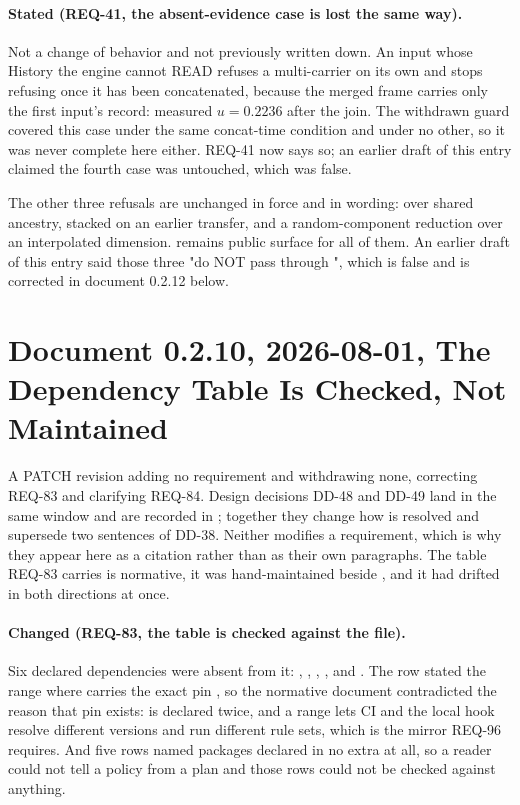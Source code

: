 \paragraph{Stated (REQ-41, the absent-evidence case is lost the same
way).} Not a change of behavior and not previously written down. An input
whose History the engine cannot READ refuses a multi-carrier
 on its own and stops refusing once it has been
concatenated, because the merged frame carries only the first input's
record: measured $u = 0.2236$ after the join. The withdrawn guard covered
this case under the same concat-time condition and under no other, so it
was never complete here either. REQ-41 now says so; an earlier draft of
this entry claimed the fourth case was untouched, which was false.

The other three refusals are unchanged in force and in wording:
 over shared ancestry,  stacked on
an earlier transfer, and a random-component reduction over an
interpolated dimension.  remains public
surface for all of them. An earlier draft of this entry said those three
"do NOT pass through ", which is false and is corrected in
document 0.2.12 below.

\section*{Document 0.2.10, 2026-08-01, The Dependency Table Is Checked, Not Maintained}

A PATCH revision adding no requirement and withdrawing none, correcting
REQ-83 and clarifying REQ-84. Design decisions DD-48 and DD-49 land in
the same window and are recorded in ; together
they change how  is resolved and supersede
two sentences of DD-38. Neither modifies a requirement, which is why
they appear here as a citation rather than as their own paragraphs. The
table REQ-83 carries is normative, it was hand-maintained beside
, and it had drifted in both directions at once.

\paragraph{Changed (REQ-83, the table is checked against the file).}
Six declared dependencies were absent from it: ,
, , , 
and . The  row stated the range
 where  carries the exact pin
, so the normative document contradicted the reason
that pin exists:  is declared twice, and a range lets CI and
the local hook resolve different versions and run different rule sets,
which is the mirror REQ-96 requires. And five rows named
packages declared in no extra at all, so a reader could not tell a
policy from a plan and those rows could not be checked against
anything.


